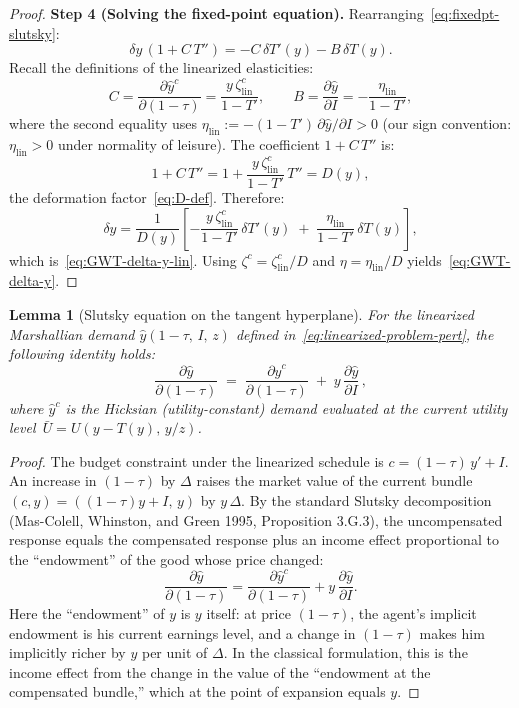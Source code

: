 \documentclass[12pt,a4paper]{article}
\theoremstyle{definition}
\theoremstyle{plain}
\newtheorem{lemma}{Lemma}[section]
\theoremstyle{remark}
\begin{document}
\begin{proof}
\medskip
\noindent\textbf{Step 4 (Solving the fixed-point equation).}
Rearranging~\eqref{eq:fixedpt-slutsky}:
\[
  \delta y\,(1 + C\,T'') = -C\,\delta T'(y) - B\,\delta T(y).
\]
Recall the definitions of the linearized elasticities:
\[
  C = \frac{\partial\hat y^c}{\partial(1-\tau)} = \frac{y\,\zeta^c_{\mathrm{lin}}}{1-T'},
  \qquad
  B = \frac{\partial\hat y}{\partial I} = -\frac{\eta_{\mathrm{lin}}}{1-T'},
\]
where the second equality uses $\eta_{\mathrm{lin}} := -(1-T')\,\partial\hat y/\partial I > 0$ (our sign convention: $\eta_{\mathrm{lin}} > 0$ under normality of leisure).  The coefficient $1 + C\,T''$ is:
\[
  1 + C\,T''
  = 1 + \frac{y\,\zeta^c_{\mathrm{lin}}}{1-T'}\,T''
  = D(y),
\]
the deformation factor~\eqref{eq:D-def}.  Therefore:
\[
  \delta y
  = \frac{1}{D(y)}
  \left[
    -\frac{y\,\zeta^c_{\mathrm{lin}}}{1-T'}\,\delta T'(y)
    \;+\;
    \frac{\eta_{\mathrm{lin}}}{1-T'}\,\delta T(y)
  \right],
\]
which is~\eqref{eq:GWT-delta-y-lin}.  Using $\zeta^c = \zeta^c_{\mathrm{lin}}/D$ and $\eta = \eta_{\mathrm{lin}}/D$ yields~\eqref{eq:GWT-delta-y}.
\end{proof}

\begin{lemma}[Slutsky equation on the tangent hyperplane]
\label{lem:slutsky-tangent}
For the linearized Marshallian demand $\hat y(1-\tau,\,I,\,z)$ defined in~\eqref{eq:linearized-problem-pert}, the following identity holds:
\begin{equation}
\label{eq:slutsky-identity}
  \frac{\partial\hat y}{\partial(1-\tau)}
  \;=\;
  \frac{\partial\hat y^c}{\partial(1-\tau)}
  \;+\;
  y\,\frac{\partial\hat y}{\partial I}\,,
\end{equation}
where $\hat y^c$ is the Hicksian (utility-constant) demand evaluated at the current utility level~$\bar U = U(y - T(y),\,y/z)$.
\end{lemma}

\begin{proof}
The budget constraint under the linearized schedule is $c = (1-\tau)\,y' + I$.  An increase in $(1-\tau)$ by $\Delta$ raises the market value of the current bundle $(c,y) = ((1-\tau)y + I,\,y)$ by $y\,\Delta$.  By the standard Slutsky decomposition (Mas-Colell, Whinston, and Green 1995, Proposition 3.G.3), the uncompensated response equals the compensated response plus an income effect proportional to the ``endowment'' of the good whose price changed:
\[
  \frac{\partial\hat y}{\partial(1-\tau)}
  = \frac{\partial\hat y^c}{\partial(1-\tau)}
  + y\,\frac{\partial\hat y}{\partial I}.
\]
Here the ``endowment'' of $y$ is $y$ itself: at price $(1-\tau)$, the agent's implicit endowment is his current earnings level, and a change in $(1-\tau)$ makes him implicitly richer by $y$ per unit of $\Delta$.  In the classical formulation, this is the income effect from the change in the value of the ``endowment at the compensated bundle,'' which at the point of expansion equals $y$.
\end{proof}
\end{document}
